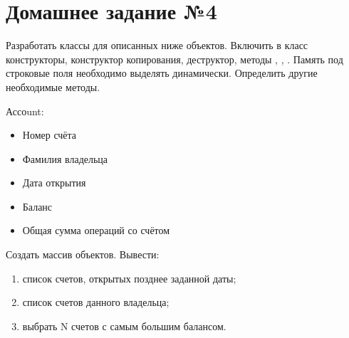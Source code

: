 \section*{Домашнее задание №4}

Разработать классы для описанных ниже объектов. Включить в класс
конструкторы, конструктор копирования, деструктор, методы ,
, . Память под строковые поля необходимо выделять
динамически. Определить другие необходимые методы.

Ассоunt:
\begin{itemize}
\item Номер счёта
\item Фамилия владельца
\item Дата открытия
\item Баланс
\item Общая сумма операций со счётом
\end{itemize}

Создать массив объектов. Вывести:
\begin{enumerate}
\item список счетов, открытых позднее заданной даты;
\item список счетов данного владельца;
\item выбрать N счетов с самым большим балансом.
\end{enumerate}
